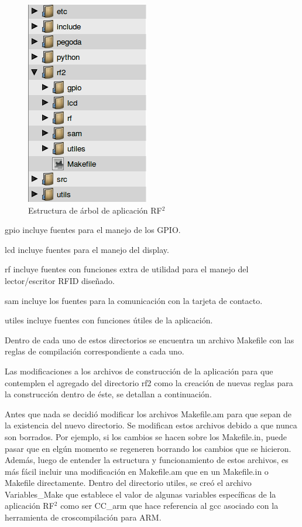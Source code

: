 \begin{figure}[H]
\centering
  \begin{center}
  \includegraphics[scale=.5]{Imagenes/estructura_librfid.png} 
  \end{center}
  \caption{Estructura de árbol de aplicación RF$^{2}$}\label{est_RF2} 
\end{figure}

gpio incluye fuentes para el manejo de los GPIO.

lcd incluye fuentes para el manejo del display.

rf incluye fuentes con funciones extra de utilidad para el manejo del lector/escritor RFID diseñado.

sam incluye los fuentes para la comunicación con la tarjeta de contacto.

utiles incluye fuentes con funciones útiles de la aplicación.

\bigskip
Dentro de cada uno de estos directorios se encuentra un archivo Makefile con las reglas de compilación correspondiente a cada uno.

\bigskip
Las modificaciones a los archivos de construcción de la aplicación para que contemplen el agregado del directorio rf2 como la creación de nuevas reglas para la construcción dentro de éste, se detallan a continuación.

\bigskip
Antes que nada se decidió modificar los archivos Makefile.am para que sepan de la existencia del nuevo directorio. Se modifican estos archivos debido a que nunca son borrados. Por ejemplo, si los cambios se hacen sobre los Makefile.in, puede pasar que en elgún momento se regeneren borrando los cambios que se hicieron. Además, luego de entender la estructura y funcionamiento de estos archivos, es más fácil incluir una modificación en Makefile.am que en un Makefile.in o Makefile directamente.
Dentro del directorio utiles, se creó el archivo Variables\_Make que establece el valor de algunas variables específicas de la aplicación RF$^{2}$ como ser CC\_arm que hace referencia al gcc asociado con la herramienta de croscompilación para ARM. 

